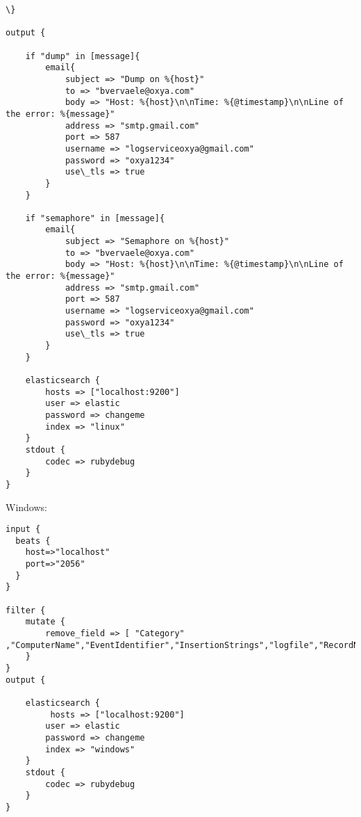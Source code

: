 \begin{lstlisting}[frame=single]
\}

output {

    if "dump" in [message]{
        email{
            subject => "Dump on %{host}"
            to => "bvervaele@oxya.com"
            body => "Host: %{host}\n\nTime: %{@timestamp}\n\nLine of the error: %{message}"
            address => "smtp.gmail.com"
            port => 587
            username => "logserviceoxya@gmail.com"
            password => "oxya1234"
            use\_tls => true
        }
    }

    if "semaphore" in [message]{
        email{
            subject => "Semaphore on %{host}" 
            to => "bvervaele@oxya.com"
            body => "Host: %{host}\n\nTime: %{@timestamp}\n\nLine of the error: %{message}"
            address => "smtp.gmail.com"
            port => 587
            username => "logserviceoxya@gmail.com"
            password => "oxya1234"
            use\_tls => true
        }
    }
    
    elasticsearch {
        hosts => ["localhost:9200"]
        user => elastic
        password => changeme
        index => "linux"
    }
    stdout { 
        codec => rubydebug
    }
}

\end{lstlisting}

Windows:
\lstset{escapechar=@,style=customc}        
\begin{lstlisting}[frame=single]
input {
  beats {
    host=>"localhost"
    port=>"2056"
  }
}
 
filter {
	mutate {
        remove_field => [ "Category" 
,"ComputerName","EventIdentifier","InsertionStrings","logfile","RecordNumber","SourceName","TimeGenerated","TimeWritten","EventType","RecordNumber","type"]
    }
}
output {
    
    elasticsearch {
         hosts => ["localhost:9200"]
        user => elastic
        password => changeme
        index => "windows"
    }
    stdout {
        codec => rubydebug
    }
}
\end{lstlisting}

